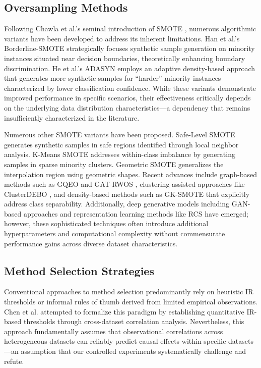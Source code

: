 \documentclass{ijSmartGrid}
\theoremstyle{definition}
\begin{document}
\subsection{Oversampling Methods}
\indent Following Chawla et al.'s seminal introduction of SMOTE \cite{chawla2002smote}, numerous algorithmic variants have been developed to address its inherent limitations. Han et al.'s Borderline-SMOTE \cite{han2005borderline} strategically focuses synthetic sample generation on minority instances situated near decision boundaries, theoretically enhancing boundary discrimination. He et al.'s ADASYN \cite{he2008adasyn} employs an adaptive density-based approach that generates more synthetic samples for ``harder'' minority instances characterized by lower classification confidence. While these variants demonstrate improved performance in specific scenarios, their effectiveness critically depends on the underlying data distribution characteristics---a dependency that remains insufficiently characterized in the literature.

Numerous other SMOTE variants have been proposed. Safe-Level SMOTE \cite{bunkhumpornpat2009safe} generates synthetic samples in safe regions identified through local neighbor analysis. K-Means SMOTE \cite{douzas2018improving} addresses within-class imbalance by generating samples in sparse minority clusters. Geometric SMOTE \cite{douzas2019geometric} generalizes the interpolation region using geometric shapes. Recent advances include graph-based methods such as GQEO \cite{gqeo2025} and GAT-RWOS \cite{gat_rwos2024}, clustering-assisted approaches like ClusterDEBO \cite{clusterdebo2025}, and density-based methods such as GK-SMOTE \cite{gk_smote2025} that explicitly address class separability. Additionally, deep generative models including GAN-based approaches \cite{mullick2019gan,engelmann2021conditional} and representation learning methods like RCS \cite{rcs2025} have emerged; however, these sophisticated techniques often introduce additional hyperparameters and computational complexity without commensurate performance gains across diverse dataset characteristics.

\subsection{Method Selection Strategies}
\indent Conventional approaches to method selection predominantly rely on heuristic IR thresholds or informal rules of thumb derived from limited empirical observations. Chen et al. \cite{chen2023syMProD} attempted to formalize this paradigm by establishing quantitative IR-based thresholds through cross-dataset correlation analysis. Nevertheless, this approach fundamentally assumes that observational correlations across heterogeneous datasets can reliably predict causal effects within specific datasets---an assumption that our controlled experiments systematically challenge and refute.
\end{document}
